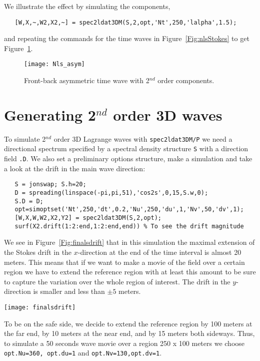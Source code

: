 We illustrate the effect by simulating the components,
{\small\begin{verbatim}
   [W,X,~,W2,X2,~] = spec2ldat3DM(S,2,opt,'Nt',250,'lalpha',1.5);
\end{verbatim}
}
\noindent
and repeating the commands for the time waves in Figure~\ref{Fig:nlsStokes} to get 
Figure~\ref{Fig:nls_asym}. 
\begin{figure}
\centerline{
\texttt{[image: Nls\_asym]}
}
\caption{Front-back asymmetric time wave with 2$^{nd}$ order components.}
\label{Fig:nls_asym}
\end{figure}

\section{Generating 2$^{nd}$ order 3D waves}\label{s:23waves} 
 To simulate 2$^{nd}$ order 3D Lagrange waves with {\tt spec2ldat3DM/P} we need a directional spectrum specified by a spectral density structure {\tt S} with a direction field {\tt .D}. We also set a preliminary options structure, make a simulation and take a look at the drift in the main wave direction:
{\small\begin{verbatim}
   S = jonswap; S.h=20;
   D = spreading(linspace(-pi,pi,51),'cos2s',0,15,S.w,0);
   S.D = D;
   opt=simoptset('Nt',250,'dt',0.2,'Nu',250,'du',1,'Nv',50,'dv',1);
   [W,X,W,W2,X2,Y2] = spec2ldat3DM(S,2,opt);
   surf(X2.drift(1:2:end,1:2:end,end)) % To see the drift magnitude
\end{verbatim}
}
\noindent
We see in Figure~\ref{Fig:finalsdrift} that in this simulation the maximal extension of the Stokes drift in the $x$-direction at the end of the time interval is almost 20 meters. This means that if we want to make a movie of the field over a certain region we have to extend the reference region with at least this amount to be sure to capture the variation over the whole region of interest. The drift in the $y$-direction is smaller and less than $\pm 5$ meters.
\begin{SCfigure}[0.8][tbh]
\texttt{[image: finalsdrift]}
\caption{Stokes drift at the end of the observation interval}
\label{Fig:finalsdrift}
\end{SCfigure}

To be on the safe side, we decide to extend the reference region by 100 meters at the far end, by 10 meters at the near end, and by 15 meters both sideways. Thus, to simulate a 50 seconds wave movie over a region 250 x 100 meters we choose {\tt opt.Nu=360, opt.du=1} and {\tt opt.Nv=130,opt.dv=1}.

